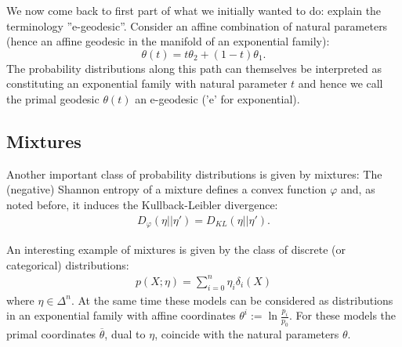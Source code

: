     We now come back to first part of what we initially wanted to do: explain the terminology ''e-geodesic''. Consider an affine combination of natural parameters (hence an affine geodesic in the manifold of an exponential family): \[\theta(t) = t\theta_2 + (1-t)\theta_1.\] The probability distributions along this path can themselves be interpreted as constituting an exponential family with natural parameter $t$ and hence we call the primal geodesic $\theta(t)$ an e-geodesic ('e' for exponential).

\subsection{Mixtures}

    Another important class of probability distributions is given by mixtures:
    The (negative) Shannon entropy of a mixture defines a convex function $\varphi$ and, as noted before, it induces the Kullback-Leibler divergence:
    \begin{gather}
        D_\varphi(\eta||\eta') = D_{KL}(\eta||\eta').
    \end{gather}

    \begin{example}
        An interesting example of mixtures is given by the class of discrete (or categorical) distributions:
        \begin{gather}
            p(X;\eta) = \sum_{i=0}^n\eta_i\delta_i(X)
        \end{gather}
        where $\eta\in\Delta^n$. At the same time these models can be considered as distributions in an exponential family with affine coordinates $\theta^i:=\ln\frac{p_i}{p_0}$. For these models the primal coordinates $\overline{\theta}$, dual to $\eta$, coincide with the natural parameters $\theta$.
    \end{example}

